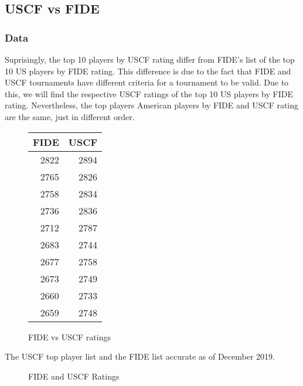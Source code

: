 \documentclass[12pt, titlepage]{article}
\begin{document}
\subsection{USCF vs FIDE}
\subsubsection{Data}
Suprisingly, the top 10 players by USCF rating differ from FIDE's list of the top 10 US players by FIDE rating. This difference is due to the fact that FIDE and USCF tournaments have different criteria for a tournament to be valid. Due to this, we will find the respective USCF ratings of the top 10 US players by FIDE rating. Nevertheless, the top players American players by FIDE and USCF rating are the same, just in different order.

\begin{figure}[H]
\centering
\begin{tabular}{rr}
FIDE & USCF\\
\hline
2822 & 2894\\
2765 & 2826\\
2758 & 2834\\
2736 & 2836\\
2712 & 2787\\
2683 & 2744\\
2677 & 2758\\
2673 & 2749\\
2660 & 2733\\
2659 & 2748\\
\end{tabular}
    \caption{FIDE vs USCF ratings}
  \end{figure}
  
The USCF top player list and the FIDE list accurate as of December 2019.

\begin{figure}[H]
\centering
{}
\caption{FIDE and USCF Ratings}
\end{figure}
\end{document}
